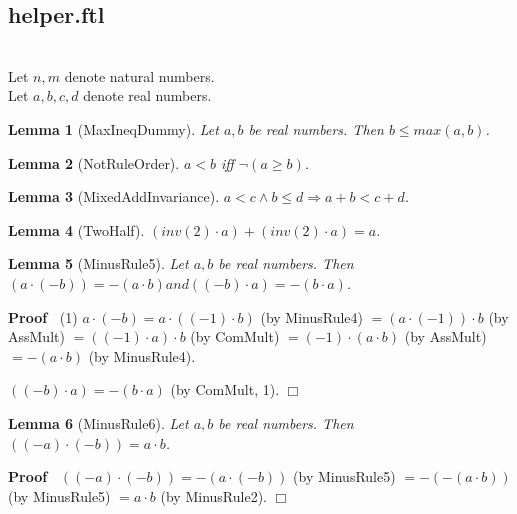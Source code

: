 \documentclass{article}
\newenvironment{forthel}{\begin{leftbar}}{\end{leftbar}}
\newenvironment{proof}{\noindent\textbf{Proof\ }}{\hspace*{\fill}$\Box$\medskip}
\newtheorem{lemma}{Lemma}
\newcommand{\dotequal}{=}
\begin{document}
\subsection{helper.ftl}

\begin{forthel}
	\\
	Let $n,m$ denote natural numbers.\\
	Let $a,b,c,d$ denote real numbers.
	
	
	
	\begin{lemma}[MaxIneqDummy]
	Let $a,b$ be real numbers. Then $b \leq max(a,b)$.
	\end{lemma}
	
	\begin{lemma}[NotRuleOrder]
	$a < b$ iff $\neg(a \geq b)$.
	\end{lemma}
	
	\begin{lemma}[MixedAddInvariance]
	$a < c \wedge b \leq d \Rightarrow a + b < c + d$.
	\end{lemma}
	
	\begin{lemma}[TwoHalf]
	$(inv(2) \cdot a) + (inv(2) \cdot a) = a$.
	\end{lemma}
	
	\begin{lemma}[MinusRule5]
	Let $a,b$ be real numbers. 
	Then $(a \cdot (-b)) = -(a \cdot b) and ((-b) \cdot a) = -(b \cdot a)$.
	\end{lemma}
	\begin{proof}
	(1) $a \cdot (-b) \dotequal a \cdot ((-1) \cdot b)$ (by MinusRule4)
	$\dotequal (a \cdot (-1)) \cdot b$ (by AssMult)
	$\dotequal ((-1) \cdot a) \cdot b$ (by ComMult)
	$\dotequal (-1) \cdot (a \cdot b)$ (by AssMult)
	$\dotequal -(a \cdot b)$ (by MinusRule4).
	
	$((-b) \cdot a) \dotequal -(b \cdot a)$ (by ComMult, 1).
	\end{proof}
	
	\begin{lemma}[MinusRule6]
	Let $a,b$ be real numbers. 
	Then $((-a) \cdot (-b)) = a \cdot b$.
	\end{lemma}
	\begin{proof}
	$((-a) \cdot (-b)) \dotequal -(a \cdot (-b))$ (by MinusRule5)
	$\dotequal -(-(a \cdot b))$ (by MinusRule5)
	$\dotequal a \cdot b$ (by MinusRule2).
	\end{proof}
	

\end{forthel}
\end{document}
